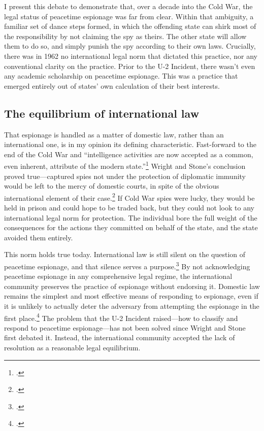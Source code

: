 \documentclass{memoir}
\begin{document}
\begin{refsegment}
I present this debate to demonstrate that, over a decade into the Cold War, the legal status of peacetime espionage was far from clear. Within that ambiguity, a familiar set of dance steps formed, in which the offending state can shirk most of the responsibility by not claiming the spy as theirs. The other state will allow them to do so, and simply punish the spy according to their own laws. Crucially, there was in 1962 no international legal norm that dictated this practice, nor any conventional clarity on the practice. Prior to the U-2 Incident, there wasn't even any academic scholarship on peacetime espionage. This was a practice that emerged entirely out of states' own calculation of their best interests.


\subsection{The equilibrium of international law}
That espionage is handled as a matter of domestic law, rather than an international one, is in my opinion its defining characteristic. Fast-forward to the end of the Cold War and ``intelligence activities are now accepted as a common, even inherent, attribute of the modern state.''\footcite[p.~321]{demarest_espionage_1995} Wright and Stone's conclusion proved true---captured spies not under the protection of diplomatic immunity would be left to the mercy of domestic courts, in spite of the obvious international element of their case.\footcite[p.~330]{demarest_espionage_1995} If Cold War spies were lucky, they would be held in prison and could hope to be traded back, but they could not look to any international legal norm for protection.  The individual bore the full weight of the consequences for the actions they committed on behalf of the state, and the state avoided them entirely.

This norm holds true today. International law is still silent on the question of peacetime espionage, and that silence serves a purpose.\footcite[p.~653]{beim_enforcing_2018} By not acknowledging peacetime espionage in any comprehensive legal regime, the international community preserves the practice of espionage without endorsing it. Domestic law remains the simplest and most effective means of responding to espionage, even if it is unlikely to actually deter the adversary from attempting the espionage in the first place.\footcite[p.~657]{beim_enforcing_2018} The problem that the U-2 Incident raised---how to classify and respond to peacetime espionage---has not been solved since Wright and Stone first debated it. Instead, the international community accepted the lack of resolution as a reasonable legal equilibrium.


\end{refsegment}
\end{document}
